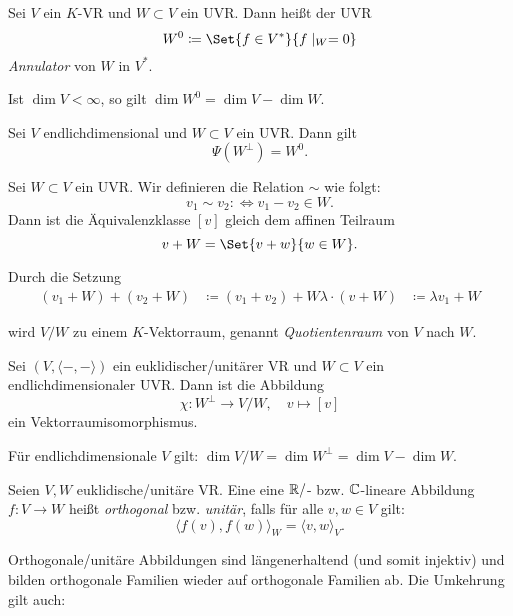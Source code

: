 \documentclass{cheat-sheet}
\begin{document}
\begin{definition}
Sei $V$ ein $K$-VR und $W \subset V$ ein UVR. Dann heißt der UVR
\[ W^0 \coloneqq \Set{ f \in V^* }{ f\mid_W = 0 } \]
\emph{Annulator} von $W$ in $V^*$.
\end{definition}

\begin{bem}
Ist $\dim V < \infty$, so gilt $\dim W^0 = \dim V - \dim W$.
\end{bem}

\begin{satz}
Sei $V$ endlichdimensional und $W \subset V$ ein UVR. Dann gilt
\[ \Psi(W^{\perp}) = W^0. \]
\end{satz}

\begin{definition}
Sei $W \subset V$ ein UVR. Wir definieren die Relation $\sim$ wie folgt:
\[ v_1 \sim v_2 :\iff v_1 - v_2 \in W. \]
Dann ist die Äquivalenzklasse $[v]$ gleich dem affinen Teilraum
\[ v + W = \Set{ v + w }{ w \in W }. \]

Durch die Setzung
\begin{align*}
(v_1 + W) + (v_2 + W) &\coloneqq (v_1 + v_2) + W
\lambda \cdot (v + W) &\coloneqq \lambda v_1 + W
\end{align*}

wird $V/W$ zu einem $K$-Vektorraum, genannt \emph{Quotientenraum} von $V$ nach $W$.
\end{definition}

\begin{satz}
Sei $(V, \langle - , - \rangle)$ ein euklidischer/unitärer VR und $W \subset V$ ein endlichdimensionaler UVR. Dann ist die Abbildung
\[ \chi : W^{\perp} \to V/W, \quad v \mapsto [v] \]
ein Vektorraumisomorphismus.
\end{satz}

\begin{kor}
Für endlichdimensionale $V$ gilt: $\dim V/W = \dim W^{\perp} = \dim V - \dim W$.
\end{kor}

\begin{definition}
Seien $V, W$ euklidische/unitäre VR. Eine eine $\mathbb{R}/$- bzw. $\mathbb{C}$-lineare Abbildung $f : V \to W$ heißt \emph{orthogonal} bzw. \emph{unitär}, falls für alle $v, w \in V$ gilt:
\[ \langle f(v) , f(w) \rangle_W = \langle v , w \rangle_V. \]
\end{definition}

\begin{bem}
Orthogonale/unitäre Abbildungen sind längenerhaltend (und somit injektiv) und bilden orthogonale Familien wieder auf orthogonale Familien ab. Die Umkehrung gilt auch:
\end{bem}
\end{document}
